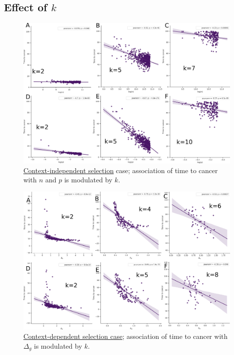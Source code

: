 \documentclass[a0,landscape]{a0poster}
\begin{document}
\begin{multicols}{3}
		\subsection{Effect of $k$}
			\begin{figure}[H]
			\centering
				\includegraphics[width=.65\linewidth, keepaspectratio=true]{fig7.png}
				\caption{\underline{Context-independent selection} case; association of time to cancer with $n$ and $p$ is modulated by $k$.}
			\end{figure}
			\begin{figure}[H]
			\centering
				\includegraphics[width=.65\linewidth, keepaspectratio=true]{fig8.png}
				\caption{\underline{Context-dependent selection case}; association of time to cancer with $\Delta_{g}$ is modulated by $k$.}
			\end{figure}


\end{multicols}
\end{document}
